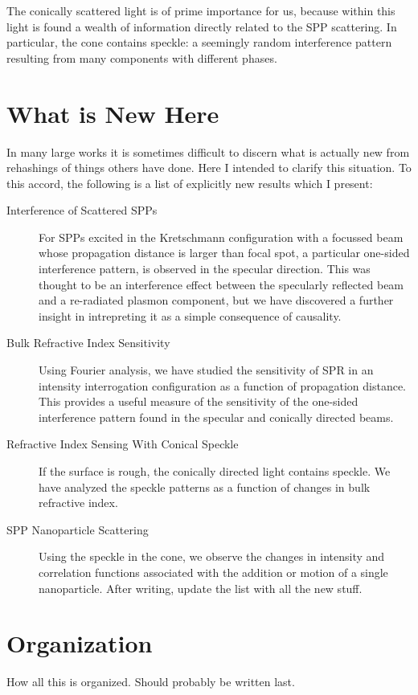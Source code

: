 \documentclass[a4paper,titlepage,onecolumn]{report}
\begin{document}
The conically scattered light is of prime importance for us, because within
this light is found a wealth of information directly related to the SPP
scattering.  In particular, the cone contains speckle: a seemingly random
interference pattern resulting from many components with different phases.

\section{What is New Here}
In many large works it is sometimes difficult to discern what is actually
new from rehashings of things others have done.  Here I intended to clarify
this situation.  To this accord, the following is a list of explicitly new
results which I present:

\begin{description}
\item[{Interference of Scattered SPPs}]
For SPPs excited in the Kretschmann configuration with a focussed beam
whose propagation distance is larger than focal spot, a particular one-sided
interference pattern, is observed in the specular direction.  This was
thought to be an interference effect between the specularly reflected beam
and a re-radiated plasmon component, but we have discovered a further
insight in intrepreting it as a simple consequence of causality.
\item[{Bulk Refractive Index Sensitivity}] 
Using Fourier analysis, we have studied the sensitivity of SPR in an intensity
interrogation configuration as a function of propagation distance.  This
provides a useful measure of the sensitivity of the one-sided interference
pattern found in the specular and conically directed beams.
\item[{Refractive Index Sensing With Conical Speckle}]
If the surface is rough, the conically directed light contains speckle.  We
have analyzed the speckle patterns as a function of changes in bulk
refractive index.
\item[{SPP Nanoparticle Scattering}]
Using the speckle in the cone, we observe the changes in intensity and
correlation functions associated with the addition or motion of a single
nanoparticle.
After writing, update the list with all the new stuff.
\end{description}

\section{Organization}
How all this is organized.  Should probably be written last.
\end{document}
